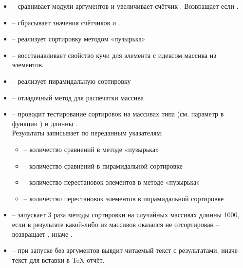 \documentclass[a4paper,12pt,titlepage,finall]{article}
\begin{document}
\begin{itemize}
\item {} \rmfamily – сравнивает модули аргументов и увеличивает счётчик \rmfamily. Возвращает  \rmfamily если \rmfamily.
\item {} \rmfamily – сбрасывает значения счётчиков  \rmfamily и  \rmfamily.
\item {} \rmfamily – реализует сортировку методом «пузырька»
\item {} \rmfamily – восстанавливает свойство кучи для элемента с идексом  \rmfamily массива  \rmfamily из  \rmfamily элементов.
\item {} \rmfamily – реализует пирамидальную сортировку
\item {} \rmfamily – отладочный метод для распечатки массива
\item {} \rmfamily – проводит тестирование сортировок на массивах типа  \rmfamily (см. параметр   \rmfamily в функции \rmfamily) и длинны \rmfamily.\\ Результаты записывает по переданным указателям:
     \begin{itemize}
     \item {} \rmfamily – количество сравнений в методе «пузырька»
     \item {} \rmfamily – количество сравнений в пирамидальной сортировке
     \item {} \rmfamily – количество перестановок элементов в методе «пузырька»
     \item {} \rmfamily – количество перестановок элементов в пирамидальной сортировке
     \end{itemize}
\item {} \rmfamily – запускает 3 раза методы сортировки на случайных массивах длинны 1000, если в результате какой-либо из массивов оказался не отсортирован – возвращает  \rmfamily, иначе \rmfamily.
\item {} \rmfamily – при запуске без аргументов вывдит читаемый текст с результатами, иначе текст для вставки в TeX отчёт.
\end{itemize}
\newpage
\end{document}
